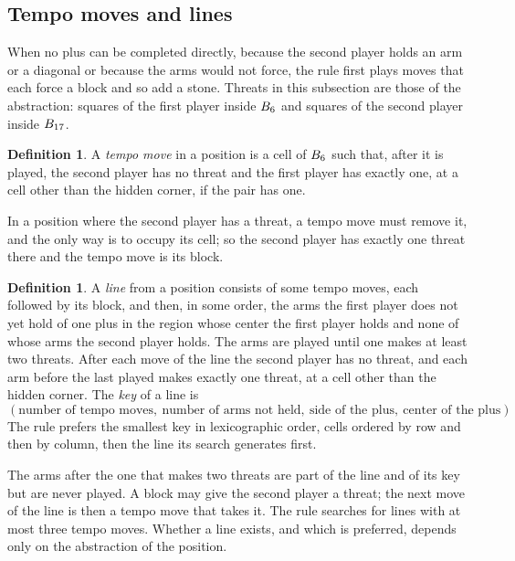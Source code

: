 \documentclass[11pt]{amsart}
\theoremstyle{definition}
\newtheorem{definition}[theorem]{Definition}
\theoremstyle{remark}
\begin{document}
\subsection{Tempo moves and lines}

When no plus can be completed directly, because the second player holds
an arm or a diagonal or because the arms would not force, the rule
first plays moves that each force a block and so add a stone. Threats
in this subsection are those of the abstraction: squares of the first
player inside $B_6$ and squares of the second player inside
$B_{17}$.

\begin{definition}\label{def:tempo}
A \emph{tempo move} in a position is a cell of $B_6$ such that,
after it is played, the second player has no threat and the first
player has exactly one, at a cell other than the hidden corner, if the
pair has one.
\end{definition}

In a position where the second player has a threat, a tempo move must
remove it, and the only way is to occupy its cell; so the second player
has exactly one threat there and the tempo move is its block.

\begin{definition}\label{def:line}
A \emph{line} from a position consists of some tempo moves, each
followed by its block, and then, in some order, the arms the first
player does not yet hold of one plus in the region whose center the
first player holds and none of whose arms the second player holds. The
arms are played until one makes at least two threats. After each move
of the line the second player has no threat, and each arm before the
last played makes exactly one threat, at a cell other than the hidden
corner. The \emph{key} of a
line is
\[
  (\text{number of tempo moves},\ \text{number of arms not held},\
  \text{side of the plus},\ \text{center of the plus}).
\]
The rule prefers the smallest key in lexicographic order, cells ordered
by row and then by column, then the line its search generates first.
\end{definition}

The arms after the one that makes two threats are part of the line and
of its key but are never played. A block may give the second player a
threat; the next move of the line is then a tempo move that takes it.
The rule searches for lines with at most three tempo moves. Whether a
line exists, and which is preferred, depends only on the abstraction of
the position.
\end{document}
